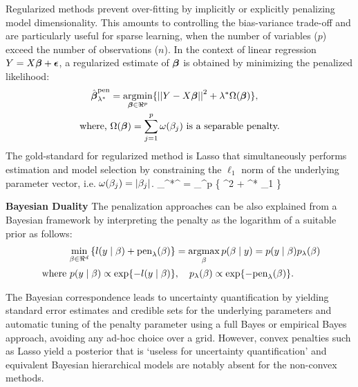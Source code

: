 \documentclass[ba]{imsart}
\begin{document}
Regularized methods prevent over-fitting by implicitly or explicitly penalizing model dimensionality. This amounts to controlling the bias-variance trade-off and are particularly useful for sparse learning, when the number of variables ($p$) exceed the number of observations ($n$). In the context of linear regression $Y = X \boldsymbol{\beta} + \boldsymbol{\epsilon}$, a regularized estimate of $\boldsymbol{\beta}$ is obtained by minimizing the penalized likelihood:
\begin{align}
\hat{\bbeta}_{\lambda^*}^{\text{pen}} & = \argmin_{\bbeta \in \Re^p} \{ \vectornorm{Y - X\bbeta}^2 + \lambda^* \Omega(\bbeta) \}, \label{eq:penalize} \\
  \text{where, } & \Omega(\bbeta) = \sum_{j=1}^{p} \omega(\beta_j) \text{ is a separable penalty.} \nonumber
\end{align}
The gold-standard for regularized method is Lasso that simultaneously performs estimation and model selection by constraining the $\ell_1$ norm of the underlying parameter vector, i.e. $\omega(\beta_j) = \lvert\beta_j\rvert$. 
\beq
\hat{\bbeta}_{\lambda^*}^{} = \argmin_{\bbeta \in \Re^p} \{ ^2 + \lambda^* \norm{\bbeta}_1 \} \label{eq:lasso}
\eeq


\noindent \textbf{Bayesian Duality} The penalization approaches can be also explained from a Bayesian framework by interpreting the penalty as the logarithm of a suitable prior as follows:
\begin{align}
 \min_{\beta \in \Re^d}
  \left\{
    l(y \mid \beta) + \text{pen}_{\lambda}(\beta) 
  \right\}
  & = \argmax_\beta p(\beta \mid y) = p(y \mid \beta) p_{\lambda}(\beta) \nonumber \\
	\text{ where } p(y \mid \beta) \propto \exp\{-l(y \mid \beta)\} & , \quad p_{\lambda}(\beta)
  \propto \exp\{ -\text{pen}_{\lambda}(\beta) \}. \label{eq:pen} \nonumber
\end{align}

The Bayesian correspondence leads to uncertainty quantification by yielding standard error estimates and credible sets for the underlying parameters and automatic tuning of the penalty parameter using a full Bayes or empirical Bayes approach, avoiding any ad-hoc choice over a grid. However, convex penalties such as Lasso yield a posterior that is `useless for uncertainty quantification' \citep{castillo2015bayesian} and equivalent Bayesian hierarchical models are notably absent for the non-convex methods. 
\end{document}
